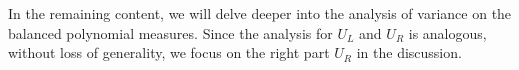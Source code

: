 \documentclass[%
 reprint,
 superscriptaddress,
 amsmath,amssymb,
 aps, prl, twocolumn, showpacs,
]{revtex4-2}
\newcommand{\RomanNumeralCaps}[1]
    {\MakeUppercase{\romannumeral #1}}
\newcommand*{\dif}{\mathop{}\!\mathrm{d}}
\begin{document}
In the remaining content, we will delve deeper into the analysis of variance on the balanced polynomial measures. Since the analysis for $U_L$ and $U_R$ is analogous, without loss of generality, we focus on the right part $U_R$ in the discussion\cite{NoteDist3}. 

\end{document}
